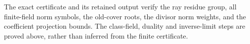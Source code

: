 The exact certificate
and its retained output verify the ray residue group,
all finite-field norm symbols, the old-cover roots,
the divisor norm weights, and the coefficient
projection bounds.  The class-field, duality and
inverse-limit steps are proved above, rather than
inferred from the finite certificate.
